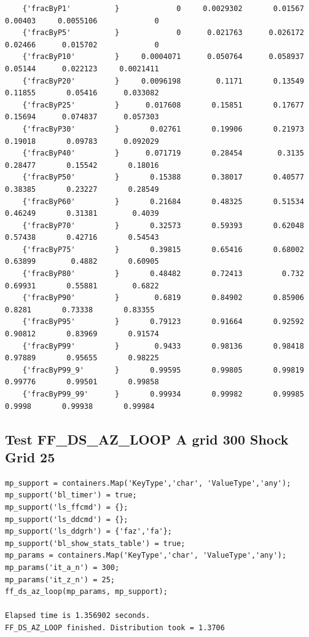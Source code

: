 \documentclass[
]{book}
\begin{document}
\begin{verbatim}
    {'fracByP1'          }             0     0.0029302       0.01567       0.00403     0.0055106             0 
    {'fracByP5'          }             0      0.021763      0.026172       0.02466      0.015702             0 
    {'fracByP10'         }     0.0004071      0.050764      0.058937       0.05144      0.022123     0.0021411 
    {'fracByP20'         }     0.0096198        0.1171       0.13549       0.11855       0.05416      0.033082 
    {'fracByP25'         }      0.017608       0.15851       0.17677       0.15694      0.074837      0.057303 
    {'fracByP30'         }       0.02761       0.19906       0.21973       0.19018       0.09783      0.092029 
    {'fracByP40'         }      0.071719       0.28454        0.3135       0.28477       0.15542       0.18016 
    {'fracByP50'         }       0.15388       0.38017       0.40577       0.38385       0.23227       0.28549 
    {'fracByP60'         }       0.21684       0.48325       0.51534       0.46249       0.31381        0.4039 
    {'fracByP70'         }       0.32573       0.59393       0.62048       0.57438       0.42716       0.54543 
    {'fracByP75'         }       0.39815       0.65416       0.68002       0.63899        0.4882       0.60905 
    {'fracByP80'         }       0.48482       0.72413         0.732       0.69931       0.55881        0.6822 
    {'fracByP90'         }        0.6819       0.84902       0.85906        0.8281       0.73338       0.83355 
    {'fracByP95'         }       0.79123       0.91664       0.92592       0.90812       0.83969       0.91574 
    {'fracByP99'         }        0.9433       0.98136       0.98418       0.97889       0.95655       0.98225 
    {'fracByP99_9'       }       0.99595       0.99805       0.99819       0.99776       0.99501       0.99858 
    {'fracByP99_99'      }       0.99934       0.99982       0.99985        0.9998       0.99938       0.99984 
\end{verbatim}

\hypertarget{test-ff_ds_az_loop-a-grid-300-shock-grid-25}{%
\subsection{Test FF\_DS\_AZ\_LOOP A grid 300 Shock Grid 25}\label{test-ff_ds_az_loop-a-grid-300-shock-grid-25}}

\begin{verbatim}
mp_support = containers.Map('KeyType','char', 'ValueType','any');
mp_support('bl_timer') = true;
mp_support('ls_ffcmd') = {};
mp_support('ls_ddcmd') = {};
mp_support('ls_ddgrh') = {'faz','fa'};
mp_support('bl_show_stats_table') = true;
mp_params = containers.Map('KeyType','char', 'ValueType','any');
mp_params('it_a_n') = 300;
mp_params('it_z_n') = 25;
ff_ds_az_loop(mp_params, mp_support);

Elapsed time is 1.356902 seconds.
FF_DS_AZ_LOOP finished. Distribution took = 1.3706
\end{verbatim}
\end{document}
